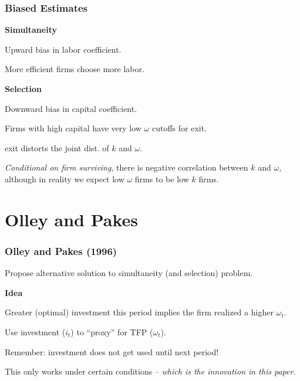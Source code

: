 \documentclass[11pt, aspectratio=169]{beamer}
\newenvironment{wideitemize}{\itemize\addtolength{\itemsep}{10pt}}{\enditemize}
\begin{document}
\begin{frame}[c]\frametitle{Biased Estimates}

\textbf{Simultaneity}
\begin{wideitemize}
	\item Upward bias in labor coefficient.
	\item More efficient firms choose more labor. 
\end{wideitemize}

\bigskip
\textbf{Selection}
\begin{wideitemize}
	\item Downward bias in capital coefficient.
	\item Firms with high capital have very low $\omega$ cutoffs for exit. 
	\item exit distorts the joint dist. of $k$ and $\omega$.
	\item \emph{Conditional on firm surviving}, there is negative correlation between $k$ and $\omega$, although in reality we expect low $\omega$ firms to be low $k$ firms.
\end{wideitemize}

    


\end{frame}



\section[OP]{Olley and Pakes} %
\label{sec:olley_and_pakes}


\begin{frame}[c]\frametitle{Olley and Pakes (1996)}
    

Propose alternative solution to simultaneity (and selection) problem.

\bigskip
\textbf{Idea}

\begin{wideitemize}
	\item Greater (optimal) investment this period implies the firm realized a higher $\omega_t$.
	\item Use investment ($i_t$) to ``proxy'' for TFP ($\omega_t$).
	\begin{wideitemize}
		\item Remember: investment does not get used until next period!
	\end{wideitemize}
	\item This only works under certain conditions -- \emph{which is the innovation in this paper.} 
\end{wideitemize}

\end{frame}
\end{document}
